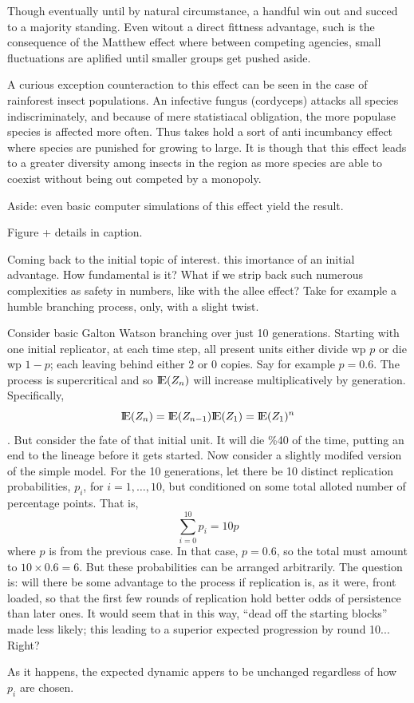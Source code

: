 Though eventually until by natural circumstance, a handful win out and succed to a majority standing. Even witout a direct fittness advantage, such is the consequence of the Matthew effect where between competing agencies, small fluctuations are aplified until smaller groups get pushed aside. 

A curious exception counteraction to this effect can be seen in the case of rainforest insect populations. An infective fungus (cordyceps) attacks all species indiscriminately, and because of mere statistiacal obligation, the more populase species is affected more often. Thus takes hold a sort of anti incumbancy effect where species are punished for growing to large. It is though that this effect leads to a greater diversity among insects in the region as more species are able to coexist without being out competed by a monopoly.

Aside: even basic computer simulations of this effect yield the result.  

Figure + details in caption. 




Coming back to the initial topic of interest. this imortance of an initial advantage. How fundamental is it? What if we strip back such numerous complexities as safety in numbers, like with the allee effect? Take for example a humble branching process, only, with a slight twist.

Consider basic Galton Watson branching over just 10 generations. Starting with one initial replicator, at each time step, all present units either divide wp $p$ or die wp $1-p$; each leaving behind either 2 or 0 copies. Say for example $p=0.6$. The process is supercritical and so ${\rm I}\!{\rm E}(Z_n)$ will increase multiplicatively by generation. Specifically, 
$${\rm I}\!{\rm E}(Z_n) = {\rm I}\!{\rm E}(Z_{n-1} ){\rm I}\!{\rm E}(Z_1) = {\rm I}\!{\rm E}(Z_1)^n$$.
But consider the fate of that initial unit. It will die \%40 of the time, putting an end to the lineage before it gets started. Now consider a slightly modifed version of the simple model. For the 10 generations, let there be 10 distinct replication probabilities, $p_i$, for $i = 1,\dots,10$, but conditioned on some total alloted number of percentage points. That is, 
$$\sum_{i=0}^{10} p_i = 10p$$
where $p$ is from the previous case. In that case, $p=0.6$, so the total must amount to $10\times 0.6 = 6$. But these probabilities can be arranged arbitrarily. The question is: will there be some advantage to the process if replication is, as it were, front loaded, so that the first few rounds of replication hold better odds of persistence than later ones. It would seem that in this way, ``dead off the starting blocks'' made less likely; this leading to a superior expected progression by round 10...  Right?\par 
As it happens, the expected dynamic appers to be unchanged regardless of how $p_i$ are chosen. 


